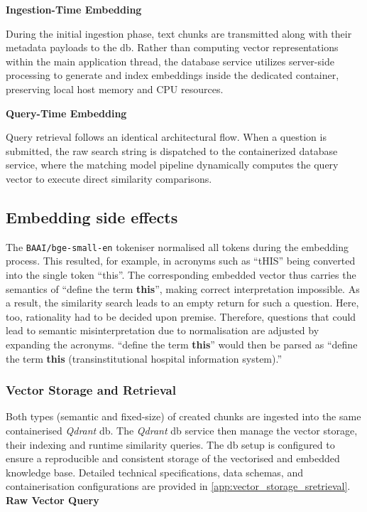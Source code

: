 \noindent \textbf{Ingestion-Time Embedding}\label{par:embedding_ingestion_solution}

During the initial ingestion phase, text chunks are transmitted along with their metadata payloads to the \ac{db}.
Rather than computing vector representations within the main application thread, the database service utilizes server-side processing to generate and index embeddings inside the dedicated container, preserving local host memory and CPU resources.

\noindent \textbf{Query-Time Embedding}\label{par:embedding_query_solution}

Query retrieval follows an identical architectural flow. When a question is submitted, the raw search string is dispatched to the containerized database service, where the matching model pipeline dynamically computes the query vector to execute direct similarity comparisons.
%
\subsection{Embedding side effects}\label{subsec:embed_problem}
The \texttt{BAAI/bge-small-en} tokeniser normalised all tokens during the embedding process.
This resulted, for example, in acronyms such as \enquote{tHIS} being converted into the single token \enquote{this}.
The corresponding embedded vector thus carries the semantics of \enquote{define the term \textbf{this}}, making correct interpretation impossible.
As a result, the similarity search leads to an empty return for such a question.
Here, too, rationality had to be decided upon premise.
Therefore, questions that could lead to semantic misinterpretation due to normalisation are adjusted by expanding the acronyms.
\enquote{define the term \textbf{this}} would then be parsed as \enquote{define the term \textbf{this} (transinstitutional hospital information system).}
%
\subsubsection{Vector Storage and Retrieval}\label{subsub:storage_retrieval_db}

Both types (semantic and fixed-size) of created chunks are ingested into the same containerised \textit{Qdrant} \ac{db}.
The \textit{Qdrant} \ac{db} service then manage the vector storage, their indexing and runtime similarity queries.
The \ac{db} setup is configured to ensure a reproducible and consistent storage of the vectorised and embedded knowledge base.
Detailed technical specifications, data schemas, and containerisation configurations are provided in \cref{app:vector_storage_sretrieval}.
%
\noindent \textbf{Raw Vector Query}

